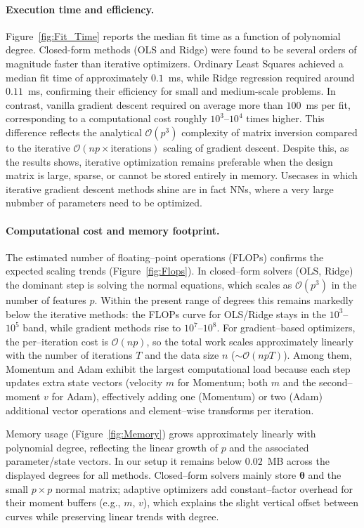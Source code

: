 \documentclass[
 reprint,            %
 amsmath,amssymb,
 aps,
]{revtex4-2}
\begin{document}
\paragraph*{Execution time and efficiency.}
Figure~\ref{fig:Fit_Time} reports the median fit time as a function of polynomial degree.
Closed-form methods (OLS and Ridge) were found to be several orders of magnitude faster than iterative optimizers.
Ordinary Least Squares achieved a median fit time of approximately $0.1$~ms, while Ridge regression required around $0.11$~ms, confirming their efficiency for small and medium-scale problems.
In contrast, vanilla gradient descent required on average more than $100$~ms per fit, corresponding to a computational cost roughly $10^3$--$10^4$ times higher.
This difference reflects the analytical $\mathcal{O}(p^3)$ complexity of matrix inversion compared to the iterative $\mathcal{O}(n p \times \text{iterations})$ \cite{golubvanloan2013,bottou2010largeScaleSGD} scaling of gradient descent.
Despite this, as the results shows, iterative optimization remains preferable when the design matrix is large, sparse, or cannot be stored entirely in memory.
Usecases in which iterative gradient descent methods shine are in fact NNs, where a very large nubmber of parameters need to be optimized\cite{goodfellow2016}.



\paragraph*{Computational cost and memory footprint.}
The estimated number of floating–point operations (FLOPs) confirms the expected scaling trends (Figure~\ref{fig:Flops}). In closed–form solvers (OLS, Ridge) the dominant step is solving the normal equations, which scales as $\mathcal{O}(p^3)$ in the number of features $p$. Within the present range of degrees this remains markedly below the iterative methods: the FLOPs curve for OLS/Ridge stays in the $10^3$–$10^5$ band, while gradient methods rise to $10^7$–$10^8$.
For gradient–based optimizers, the per–iteration cost is $\mathcal{O}(np)$, so the total work scales approximately linearly with the number of iterations $T$ and the data size $n$ ($\sim\mathcal{O}(n p T)$). Among them, Momentum and Adam exhibit the largest computational load because each step updates extra state vectors\cite{polyak1964heavyball,kingma2015adam} (velocity $m$ for Momentum; both $m$ and the second–moment $v$ for Adam), effectively adding one (Momentum) or two (Adam) additional vector operations and element–wise transforms per iteration.

Memory usage (Figure~\ref{fig:Memory}) grows approximately linearly with polynomial degree, reflecting the linear growth of $p$ and the associated parameter/state vectors. In our setup it remains below $0.02$~MB across the displayed degrees for all methods. Closed–form solvers mainly store $\boldsymbol{\theta}$ and the small $p\times p$ normal matrix; adaptive optimizers add constant–factor overhead for their moment buffers (e.g., $m$, $v$), which explains the slight vertical offset between curves while preserving linear trends with degree.

\end{document}
